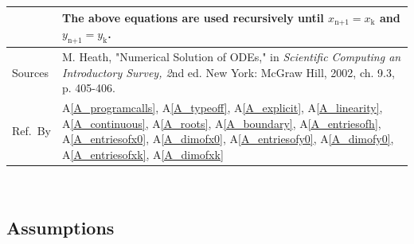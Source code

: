 \documentclass[12pt]{article}
\newcommand{\colAwidth}{0.13\textwidth}
\newcommand{\colBwidth}{0.82\textwidth}
\newcommand{\aref}[1]{A\ref{#1}}
\begin{document}
\begin{minipage}{\textwidth}
\begin{tabular}{| p{\colAwidth} | p{\colBwidth}|}
  & The above equations are used recursively until $x_\text{n+1} = x_\text{k}$ and $y_\text{n+1} =
  y_\text{k}$.
  \\
  \hline
  Sources&
        M. Heath, "Numerical Solution of ODEs," in \textit{Scientific Computing an
        Introductory Survey, 2}nd ed. New York: McGraw Hill, 2002, ch. 9.3, p. 405-406.
        ~\cite{Heath2002} 
  \\
  \hline
  Ref.\ By & \aref{A_programcalls},
  \aref{A_typeoff}, \aref{A_explicit}, \aref{A_linearity},
  \aref{A_continuous}, \aref{A_roots}, \aref{A_boundary}, \aref{A_entriesofh}, 
  \aref{A_entriesofx0}, \aref{A_dimofx0}, \aref{A_entriesofy0}, \aref{A_dimofy0},
  \aref{A_entriesofxk}, \aref{A_dimofxk}

  \\
  \hline
\end{tabular}
\end{minipage}\\

\subsection{Assumptions} \label{sec_Assumptions}
\end{document}
